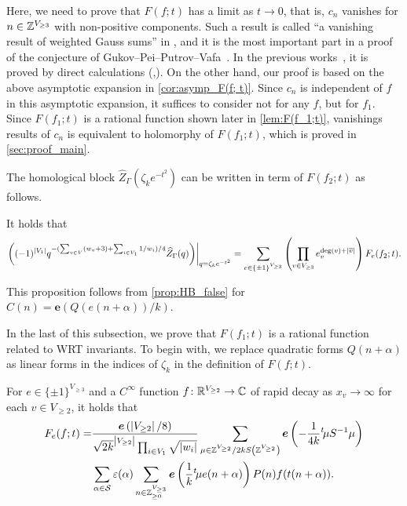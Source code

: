 \documentclass[11pt,a4paper,lualatex]{amsart}
\numberwithin{equation}{section} %
\begin{document}
Here, we need to prove that $ F(f; t) $ has a limit as $ t \to 0 $, that is, $ c_n $ vanishes for $ n \in \mathbb{Z}^{V_{\ge 3}} $ with non-positive components.
Such a result is called ``a vanishing result of weighted Gauss sums'' in \cite{MM}, and it is the most important part in a proof of the conjecture of Gukov--Pei--Putrov--Vafa~\cite[Conjecture 2.1, Equation (A.28)]{GPPV}.
In the previous works~\cite{BMM_high_depth,MM}, it is proved by direct calculations (\cite[Theorem 4.1]{BMM_high_depth},\cite[Proposition 4.2]{MM}).
On the other hand, our proof is based on the above asymptotic expansion in \cref{cor:asymp_F(f; t)}.
Since $ c_n $ is independent of $ f $ in this asymptotic expansion, it suffices to consider not for any $ f $, but for $ f_1 $.
Since $ F(f_1; t) $ is a rational function shown later in \cref{lem:F(f_1;t)}, vanishings results of $ c_n $ is equivalent to holomorphy of $ F(f_1; t) $, which is proved in \cref{sec:proof_main}.

The homological block $ \widehat{Z}_{\Gamma} (\zeta_k e^{-t^2}) $ can be written in term of $ F(f_2; t) $ as follows.

\begin{prop} \label{prop:HB_lim}
	It holds that
	\[
	\left. \left(
		(-1)^{\left\lvert V_1\right\rvert} q^{-(\sum_{v \in V} (w_{v} + 3) + \sum_{i \in V_1} 1/w_i)/4} 
		\widehat{Z}_{\Gamma} (q) 
		\right) \right|_{q =\zeta_k e^{-t^2}}
	= 
	\sum_{e \in \{ \pm 1 \}^{V_{\ge 3}}} \left( \prod_{v \in V_{\ge 3}} e_v^{\deg (v) + \left\lvert\overline{v}\right\rvert} \right)
	F_e(f_2; t).
	\]
\end{prop}

This proposition follows from \cref{prop:HB_false} for $ C(n) = \bm{e}\left( Q(e(n + \alpha))/k \right) $.

In the last of this subsection, we prove that $ F(f_1; t) $ is a rational function related to WRT invariants.
To begin with, we replace quadratic forms $ Q(n + \alpha) $ as linear forms in the indices of $ \zeta_k $ in the definition of $ F(f; t) $.

\begin{lem} \label{lem:F(f;t)}
	For $ e \in \{ \pm 1 \}^{V_{\ge 3}} $ and a $ C^\infty $ function $ f \colon \mathbb{R}^{V_{\ge 2}} \to \mathbb{C} $ of rapid decay as $ x_v \to \infty $ for each $ v \in V_{\ge 2} $, it holds that
	\begin{align}
		F_e(f; t) = 
		&\frac{\bm{e} \left( \left\lvert V_{\ge 2}\right\rvert/8 \right)}{\sqrt{2k}^{\left\lvert V_{\ge 2}\right\rvert} \prod_{i \in V_1} \sqrt{\left\lvert w_i\right\rvert}}
		\sum_{ \mu \in \mathbb{Z}^{V_{\ge 2}} / 2kS \left(\mathbb{Z}^{V_{\ge 2}} \right) } 
		\bm{e} \left( -\frac{1}{4k} {}^t\!\mu S^{-1} \mu \right) \\
		&\sum_{\alpha \in \mathcal{S}} \varepsilon(\alpha)
		\sum_{n \in \mathbb{Z}_{\ge 0}^{V_{\ge 3}}}
		\bm{e}\left( \frac{1}{k} {}^t\!\mu e(n + \alpha) \right) P(n) f(t(n + \alpha)).
	\end{align}
\end{lem}
\end{document}
